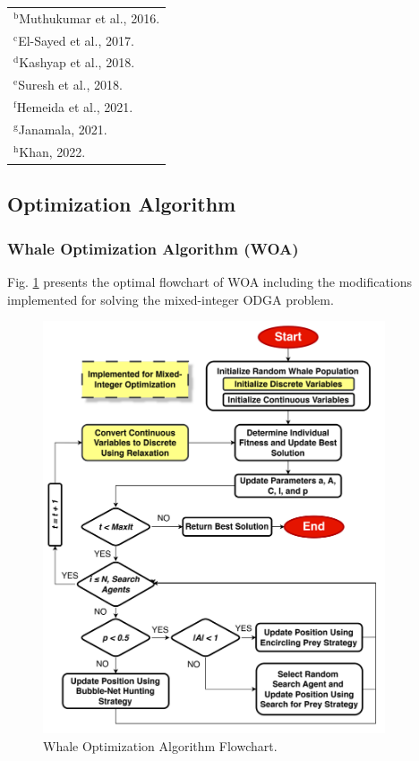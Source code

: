 \documentclass[12pt]{article}
\begin{document}
\begin{table}[htbp]
\begin{center}
{\begin{tabular}{ccccc}
					\multicolumn{5}{l}{$^{\mathrm{b}}${\scriptsize Muthukumar et al., 2016.}} \\
					\multicolumn{5}{l}{$^{\mathrm{c}}${\scriptsize El-Sayed et al., 2017.}} \\
					\multicolumn{5}{l}{$^{\mathrm{d}}${\scriptsize Kashyap et al., 2018.}} \\
					\multicolumn{5}{l}{$^{\mathrm{e}}${\scriptsize Suresh et al., 2018.}} \\
					\multicolumn{5}{l}{$^{\mathrm{f}}${\scriptsize Hemeida et al., 2021.}} \\
					\multicolumn{5}{l}{$^{\mathrm{g}}${\scriptsize Janamala, 2021.}} \\
					\multicolumn{5}{l}{$^{\mathrm{h}}${\scriptsize Khan, 2022.}} \\
				\end{tabular}%
			}
			\label{tab:singleDGcomparison}
		\end{center}
	\end{table}
	
	\subsection{Optimization Algorithm}
	\subsubsection{Whale Optimization Algorithm (WOA)}
	
	Fig. \ref{fig:WOAflowchart} presents the optimal flowchart of WOA including the modifications implemented for solving the mixed-integer ODGA problem.
	
	\begin{figure}[htbp]
		\centerline{\includegraphics[width=0.9\textwidth]{WOAflowchart.png}}
		\caption{Whale Optimization Algorithm Flowchart.}
		\label{fig:WOAflowchart}
	\end{figure}
	
\end{document}
